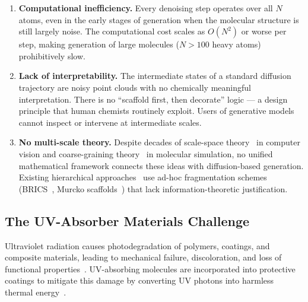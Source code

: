 \documentclass[11pt,a4paper]{article}
\begin{document}
\begin{enumerate}[leftmargin=*]
  \item \textbf{Computational inefficiency.} Every denoising step operates over all $N$
    atoms, even in the early stages of generation when the molecular structure is still
    largely noise. The computational cost scales as $O(N^2)$ or worse per step, making
    generation of large molecules ($N > 100$ heavy atoms) prohibitively slow.

  \item \textbf{Lack of interpretability.} The intermediate states of a standard diffusion
    trajectory are noisy point clouds with no chemically meaningful interpretation. There is
    no ``scaffold first, then decorate'' logic --- a design principle that human chemists
    routinely exploit. Users of generative models cannot inspect or intervene at intermediate
    scales.

  \item \textbf{No multi-scale theory.} Despite decades of scale-space
    theory~\citep{lindeberg1994scalespace,witkin1987scalespace,koenderink1984structure} in
    computer vision and coarse-graining theory~\citep{noid2008cg,kmiecik2016cg} in molecular
    simulation, no unified mathematical framework connects these ideas with diffusion-based
    generation. Existing hierarchical approaches~\citep{qiang2023hierdiff} use ad-hoc
    fragmentation schemes (BRICS~\citep{degen2008brics}, Murcko
    scaffolds~\citep{bemis1996murcko}) that lack information-theoretic justification.
\end{enumerate}

\subsection{The UV-Absorber Materials Challenge}

Ultraviolet radiation causes photodegradation of polymers, coatings, and composite
materials, leading to mechanical failure, discoloration, and loss of functional
properties~\citep{yousif2013photodegradation}. UV-absorbing molecules are incorporated
into protective coatings to mitigate this damage by converting UV photons into harmless
thermal energy~\citep{gugumus1995stabilization,schaller2009uv}.
\end{document}
